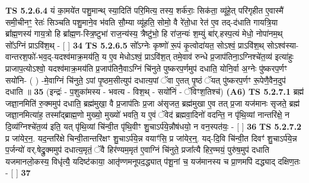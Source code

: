 \documentclass[17pt]{extarticle}
\begin{document}
                  \newline
                                \textbf{ TS 5.2.6.4} \newline
                  यं का॒मये॑त पशु॒मान्थ् स्या॒दिति॑ परि॒मित्य॒ तस्य॒ शर्क॑राः॒ सिक॑ता॒ व्यू॑हे॒त् परि॑गृहीत ए॒वास्मै॑ समी॒चीनꣳ॒॒ रेतः॑ सिञ्चति पशु॒माने॒व भ॑वति सौ॒म्या व्यू॑हति॒ सोमो॒ वै रे॑तो॒धा रेत॑ ए॒व तद्-द॑धाति गायत्रि॒या ब्रा᳚ह्म॒णस्य॑ गाय॒त्रो हि ब्रा᳚ह्म॒ण-स्त्रि॒ष्टुभा॑ राज॒न्य॑स्य॒ त्रैष्टु॑भो॒ हि रा॑ज॒न्यः॑ श॒म्युं बा॑र्.हस्प॒त्यं मेधो॒ नोपा॑नम॒थ् सो᳚ऽग्निं प्राऽवि॑श॒थ् - [  ] \textbf{  34} \newline
                  \newline
                                \textbf{ TS 5.2.6.5} \newline
                  सो᳚ऽग्नेः कृष्णो॑ रू॒पं कृ॒त्वोदा॑यत॒ सोऽश्वं॒ प्राऽवि॑श॒थ् सोऽश्व॑स्या-वान्तरश॒फो॑-भव॒द्-यदश्व॑माक्र॒मय॑ति॒ य ए॒व मेधोऽश्वं॒ प्राऽवि॑श॒त् तमे॒वाव॑ रुन्धे प्र॒जाप॑तिना॒ऽग्निश्चे॑त॒व्य॑ इत्या॑हुः प्राजाप॒त्योऽश्वो॒ यदश्व॑माक्र॒मय॑ति प्र॒जाप॑तिनै॒वाऽग्निं चि॑नुते पुष्करप॒र्णमुप॑ दधाति॒ योनि॒र्वा अ॒ग्नेः पु॑ष्करप॒र्णꣳ सयो॑नि- ( ) -मे॒वाग्निं चि॑नुते॒ ऽपां पृ॒ष्ठम॒सीत्युप॑ दधात्य॒पां ॅवा ए॒तत् पृ॒ष्ठं ॅयत् पु॑ष्करप॒र्णꣳ रू॒पेणै॒वैन॒दुप॑ दधाति ॥ \textbf{  35} \newline
                  \newline
                      (इन्द्रः॑ - प॒शुका॑मस्य - भवत्य - विश॒थ् - सयो॑निं - ॅविꣳश॒तिश्च॑)  \textbf{(A6)} \newline \newline
                                        \textbf{ TS 5.2.7.1} \newline
                  ब्रह्म॑ जज्ञा॒नमिति॑ रु॒क्ममुप॑ दधाति॒ ब्रह्म॑मुखा॒ वै प्र॒जाप॑तिः प्र॒जा अ॑सृजत॒ ब्रह्म॑मुखा ए॒व तत् प्र॒जा यज॑मानः सृजते॒ ब्रह्म॑ जज्ञा॒नमित्या॑ह॒ तस्मा᳚द्ब्राह्म॒णो मुख्यो॒ मुख्यो॑ भवति॒ य ए॒वं ॅवेद॑ ब्रह्मवा॒दिनो॑ वदन्ति॒ न पृ॑थि॒व्यां नान्तरि॑क्षे॒ न दि॒व्य॑ग्निश्चे॑त॒व्य॑ इति॒ यत् पृ॑थि॒व्यां चि॑न्वी॒त पृ॑थि॒वीꣳ शु॒चाऽर्प॑ये॒न्नौष॑धयो॒ न वन॒स्पत॑यः॒ - [  ] \textbf{  36} \newline
                  \newline
                                \textbf{ TS 5.2.7.2} \newline
                  प्र जा॑येर॒न॒. यद॒न्तरि॑क्षे चिन्वी॒तान्तरि॑क्षꣳ शु॒चाऽर्प॑ये॒न्न वयाꣳ॑सि॒ प्र जा॑येर॒न्॒. यद्-दि॒वि चि॑न्वी॒त दिवꣳ॑ शु॒चाऽर्प॑ये॒न्न प॒र्जन्यो॑ वर्.षेद्रु॒क्ममुप॑ दधात्य॒मृतं॒ ॅवै हिर॑ण्यम॒मृत॑ ए॒वाग्निं चि॑नुते॒ प्रजा᳚त्यै हिर॒ण्मयं॒ पुरु॑ष॒मुप॑ दधाति यजमानलो॒कस्य॒ विधृ॑त्यै॒ यदिष्ट॑काया॒ आतृ॑ण्णमनूपद॒द्ध्यात् प॑शू॒नां च॒ यज॑मानस्य च प्रा॒णमपि॑ दद्ध्याद् दक्षिण॒तः - [  ] \textbf{  37} \newline
\end{document}
